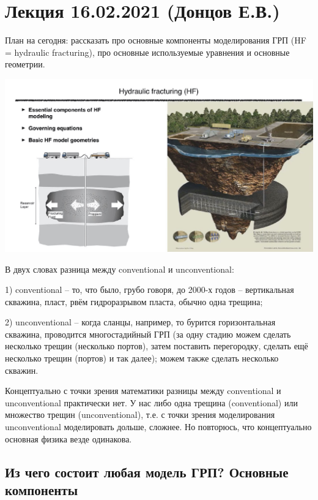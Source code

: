 \documentclass[main.tex]{subfiles}
\begin{document}

\section{Лекция 16.02.2021 (Донцов Е.В.)}

План на сегодня: рассказать про основные компоненты моделирования ГРП (HF = hydraulic fracturing), про основные используемые уравнения и основные геометрии.

\includegraphics[width=\textwidth, page=1]{HF_slides.pdf}

В двух словах разница между conventional и unconventional:

1) conventional -- то, что было, грубо говоря, до 2000-х годов -- вертикальная скважина, пласт, рвём гидроразрывом пласта, обычно одна трещина;

2) unconventional -- когда сланцы, например, то бурится горизонтальная скважина, проводится многостадийный ГРП (за одну стадию можем сделать несколько трещин (несколько портов), затем поставить перегородку, сделать ещё несколько трещин (портов) и так далее); можем также сделать несколько скважин.

Концептуально с точки зрения математики разницы между conventional и unconventional практически нет.
У нас либо одна трещина (conventional) или множество трещин (unconventional), т.е. с точки зрения моделирования unconventional моделировать дольше, сложнее.
Но повторюсь, что концептуально основная физика везде одинакова.

\subsection{Из чего состоит любая модель ГРП? Основные компоненты}
\end{document}
